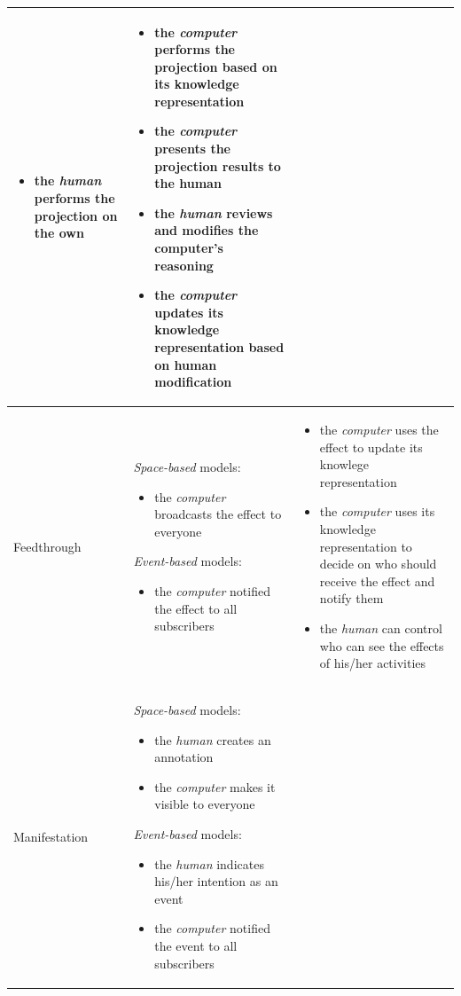 {\begin{longtable}{>{\raggedright}p{1.1in}>{\raggedright}p{2.2in}>{\raggedright}p{2.2in}}
\begin{itemize}[nosep]
\item the \emph{human} performs the projection on the own\end{itemize}
 & \begin{itemize}[nosep]
\item the \emph{computer} performs the projection based on its knowledge
representation
\item the \emph{computer} presents the projection results to the human
\item the \emph{human} reviews and modifies the computer's reasoning
\item the \emph{computer} updates its knowledge representation based on
human modification\end{itemize}
\tabularnewline
\midrule 
Feedthrough & \emph{Space-based} models:
\begin{itemize}[nosep]
\item the \emph{computer} broadcasts the effect to everyone
\end{itemize}
\emph{Event-based} models:
\begin{itemize}[nosep]
\item the \emph{computer} notified the effect to all subscribers\end{itemize}
 & \begin{itemize}[nosep]
\item the \emph{computer} uses the effect to update its knowlege representation
\item the \emph{computer} uses its knowledge representation to decide on
who should receive the effect and notify them
\item the \emph{human} can control who can see the effects of his/her activities\end{itemize}
\tabularnewline
\midrule 
Manifestation & \emph{Space-based} models: 
\begin{itemize}[nosep]
\item the \emph{human} creates an annotation 
\item the \emph{computer} makes it visible to everyone
\end{itemize}
\emph{Event-based} models:
\begin{itemize}[nosep]
\item the \emph{human} indicates his/her intention as an event
\item the \emph{computer} notified the event to all subscribers\end{itemize}
 & \begin{itemize}[nosep]

\end{itemize}
\end{longtable}}
